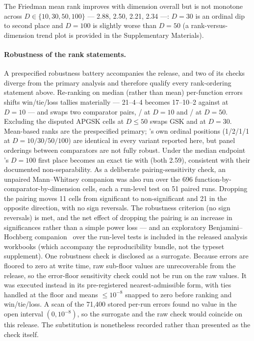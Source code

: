 The Friedman mean rank improves with dimension overall but is not monotone
across $D \in \{10, 30, 50, 100\}$ --- 2.88, 2.50, 2.21, 2.34 ---: $D = 30$
is an ordinal dip to second place and $D = 100$ is slightly worse than
$D = 50$ (a rank-versus-dimension trend plot is provided in the Supplementary
Materials).

\paragraph{Robustness of the rank statements.}
A prespecified robustness battery accompanies the release, and two
of its checks diverge from the primary analysis and therefore qualify
every rank-ordering statement above. Re-ranking on median (rather
than mean) per-function errors shifts win/tie/loss tallies materially
--- 21--4--4 becomes 17--10--2 against \egsk{} at $D = 10$ --- and
swaps two comparator pairs, \apgsk{}/\egsk{} at $D = 10$ and
\fdbagsk{}/\atmals{} at $D = 50$. Excluding the disputed APGSK cells
at $D \leq 50$ swaps GSK and \fdbagsk{} at $D = 30$.
Mean-based ranks are the prespecified primary; \dtgsk{}'s own
ordinal positions (1/2/1/1 at $D = 10/30/50/100$) are identical in
every variant reported here, but panel orderings between comparators are not fully
robust. Under the median endpoint \dtgsk{}'s $D = 100$ first place becomes
an exact tie with \egsk{} (both 2.59), consistent with their documented
non-separability. As a deliberate pairing-sensitivity check, an unpaired Mann--Whitney companion was also run over the
696 function-by-comparator-by-dimension cells, each a run-level test on 51
paired runs. Dropping the pairing moves 11 cells from significant to
non-significant and 21 in the opposite direction, with no sign reversals. The
robustness criterion (no sign reversals) is met, and the net effect of
dropping the pairing is an increase in significances rather than a
simple power loss --- and an
exploratory Benjamini--Hochberg
companion~\cite{benjamini1995controlling} over the run-level tests is
included in the released analysis workbooks (which accompany the
reproducibility bundle, not the typeset supplement).
One robustness check is disclosed as a surrogate. Because errors are floored
to zero at write time, raw sub-floor values are unrecoverable from the
release, so the error-floor sensitivity check could not be run on the raw
values. It was executed instead in its pre-registered nearest-admissible form,
with ties handled at the floor and means $\le 10^{-8}$ snapped to zero before
ranking and win/tie/loss. A scan of the 71,400 stored per-run errors found no
value in the open interval $(0, 10^{-8})$, so the surrogate and the raw check
would coincide on this release. The substitution is nonetheless recorded rather
than presented as the check itself.

